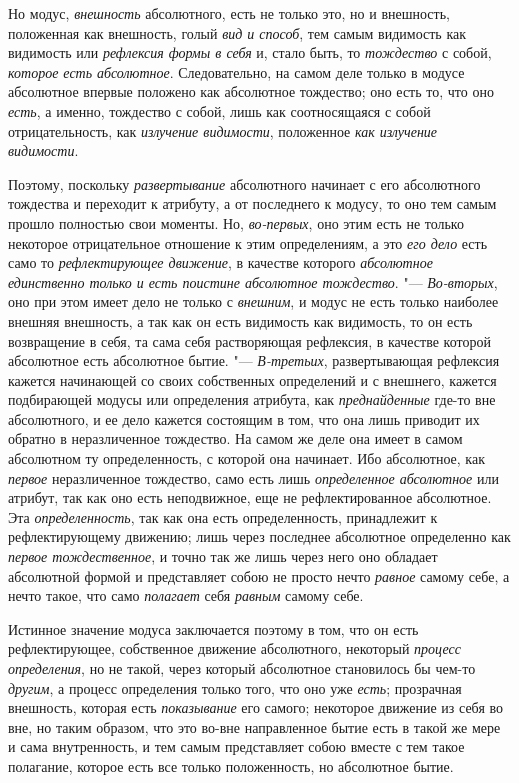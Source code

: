 Но модус, {\em внешность} абсолютного, есть не только
это, но и внешность, положенная как внешность, голый
{\em вид и способ}, тем самым видимость как видимость
или {\em рефлексия формы в себя} и, стало быть, то {\em тождество} с собой,
{\em которое есть абсолютное}. Следовательно, на самом
деле только в модусе абсолютное впервые положено как абсолютное тождество;
оно есть то, что оно {\em есть}, а именно, тождество с
собой, лишь как соотносящаяся с собой отрицательность, как
{\em излучение видимости}, положенное {\em как излучение видимости}.

Поэтому, поскольку {\em развертывание} абсолютного
начинает с его абсолютного тождества и переходит к атрибуту, а от
последнего к модусу, то оно тем самым прошло полностью свои моменты. Но,
{\em во-первых}, оно этим есть не только некоторое
отрицательное отношение к этим определениям, а это {\em его дело} есть само то
{\em рефлектирующее движение}, в качестве которого
{\em абсолютное единственно только и есть поистине
абсолютное тождество}. "--- {\em Во-вторых}, оно при этом
имеет дело не только с {\em внешним}, и модус не есть
только наиболее внешняя внешность, а так как он есть видимость как
видимость, то он есть возвращение в себя, та сама себя растворяющая
рефлексия, в качестве которой абсолютное есть абсолютное бытие. "---
{\em В-третьих}, развертывающая рефлексия кажется
начинающей со своих собственных определений и с внешнего, кажется
подбирающей модусы или определения атрибута, как
{\em преднайденные} где-то вне абсолютного, и ее дело
кажется состоящим в том, что она лишь приводит их обратно в неразличенное
тождество. На самом же деле она имеет в самом абсолютном ту определенность,
с которой она начинает. Ибо абсолютное, как
{\em первое} неразличенное тождество, само есть лишь
{\em определенное абсолютное} или атрибут, так как оно
есть неподвижное, еще не рефлектированное абсолютное. Эта
{\em определенность}, так как она есть определенность,
принадлежит к рефлектирующему движению; лишь через последнее абсолютное
определенно как {\em первое тождественное}, и точно так
же лишь через него оно обладает абсолютной формой и представляет собою не
просто нечто {\em равное} самому себе, а нечто такое,
что само {\em полагает} себя
{\em равным} самому себе.

Истинное значение модуса заключается поэтому в том, что он есть
рефлектирующее, собственное движение абсолютного, некоторый
{\em процесс определения}, но не такой, через который
абсолютное становилось бы чем-то {\em другим}, а
процесс определения только того, что оно уже
{\em есть}; прозрачная внешность, которая есть
{\em показывание} его самого; некоторое движение из
себя во вне, но таким образом, что это во-вне направленное бытие есть в
такой же мере и сама внутренность, и тем самым представляет собою вместе с
тем такое полагание, которое есть все только положенность, но абсолютное
бытие.

